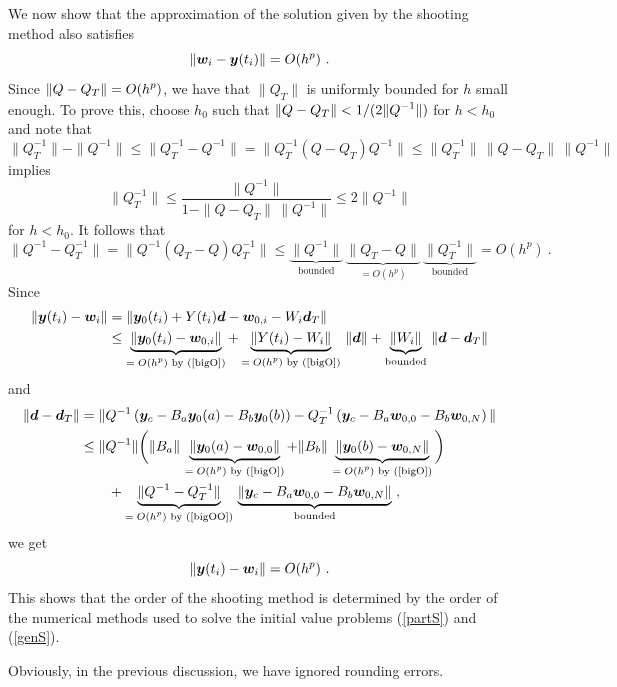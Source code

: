 We now show that the approximation of
the solution given by the shooting method also satisfies
\[
\| \bm{w}_i - \bm{y}(t_i) \| = O(h^p) \ .
\]
Since $\displaystyle \| Q - Q_T \| = O(h^p)$, we have that $\|Q_T\|$
is uniformly bounded for $h$ small enough.  To prove this, choose
$h_0$ such that
$\displaystyle \|Q - Q_T\| < 1/(2\|Q^{-1}\|) $ for $h < h_0$ and note that
\[
\|Q_T^{-1}\| - \|Q^{-1}\| \leq \|Q_T^{-1} - Q^{-1}\|
= \| Q_T^{-1} (Q - Q_T) Q^{-1} \|
\leq \|Q_T^{-1}\| \, \|Q- Q_T \| \, \|Q^{-1}\|
\]
implies
\[
\|Q_T^{-1}\| \leq \frac{\|Q^{-1}\|}{1- \|Q-Q_T\|\,\|Q^{-1}\|} \leq 2\|Q^{-1}\|
\]
for $h < h_0$.  It follows that
\begin{equation} \label{bigOO}
\| Q^{-1} - Q_T^{-1} \| = \| Q^{-1}(Q_T - Q) Q_T^{-1}\|
\leq \underbrace{\| Q^{-1}\|}_{\text{bounded}}\,
\underbrace{\|Q_T - Q\|}_{=O(h^p)}\,\underbrace{\| Q_T^{-1}\|}_{\text{bounded}}
= O(h^p) \ .
\end{equation}
Since
\begin{align*}
\| \bm{y}(t_i) - \bm{w}_i \|
&= \| \bm{y}_0(t_i) + Y(t_i)\bm{d} - \bm{w}_{0,i}
- W_i \bm{d}_T \| \\
& \leq \underbrace{\| \bm{y}_0(t_i) - \bm{w}_{0,i}
\|}_{\text{$=O(h^p)$ by (\ref{bigO})}} +
\underbrace{\| Y(t_i) - W_i
\|}_{\text{$=O(h^p)$ by (\ref{bigO})}}
\,\| \bm{d} \| +
\underbrace{\| W_i \|}_{\text{bounded}}
\,\| \bm{d} - \bm{d}_T \|
\end{align*}
and
\begin{align*}
\| \bm{d} - \bm{d}_T \| &
= \| Q^{-1} \left( \bm{y}_c - B_a \bm{y}_0(a)
- B_b \bm{y}_0(b)\right)
- Q_T^{-1} \left( \bm{y}_c - B_a \bm{w}_{0,0}
- B_b \bm{w}_{0,N} \right) \| \\
&\leq \| Q^{-1} \| \bigg( \| B_a \| \,
\underbrace{\| \bm{y}_0(a) - \bm{w}_{0,0}
\|}_{\text{$=O(h^p)$ by (\ref{bigO})}}
+ \| B_b \| \,
\underbrace{\| \bm{y}_0(b) - \bm{w}_{0,N}
\|}_{\text{$=O(h^p)$ by (\ref{bigO})}} \bigg) \\
& \qquad + \underbrace{\| Q^{-1} - Q^{-1}_T
\|}_{\text{$=O(h^p)$ by (\ref{bigOO})}}
\,\underbrace{\| \bm{y}_c - B_a \bm{w}_{0,0} - B_b \bm{w}_{0,N}
\|}_{\text{bounded}} \ ,
\end{align*}
we get
\[
\| \bm{y}(t_i) - \bm{w}_i \| = O(h^p) \ .
\]
This shows that the order of the shooting method is determined by the
order of the numerical methods used to solve the initial value
problems (\ref{partS}) and (\ref{genS}).

Obviously, in the previous discussion, we have ignored rounding errors.

